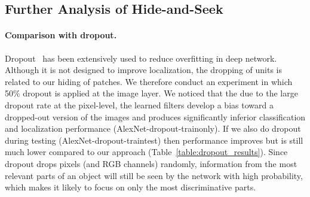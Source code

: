 \documentclass[10pt,twocolumn,letterpaper]{article}
\begin{document}
\subsection{Further Analysis of Hide-and-Seek}\paragraph{Comparison with dropout.}  Dropout~\cite{srivastava-jmlr2014} has been extensively used to reduce overfitting in deep network.  Although it is not designed to improve localization, the dropping of units is related to our hiding of patches. We therefore conduct an experiment in which 50\% dropout is applied at the image layer. We noticed that the due to the large dropout rate at the pixel-level, the learned filters develop a bias toward a dropped-out version of the images and produces significantly inferior classification and localization performance (AlexNet-dropout-trainonly). If we also do dropout during testing (AlexNet-dropout-traintest) then performance improves but is still much lower compared to our approach (Table~\ref{table:dropout_results}).   Since dropout drops pixels (and RGB channels) randomly, information from the most relevant parts of an object will still be seen by the network with high probability, which makes it likely to focus on only the most discriminative parts.
\end{document}
